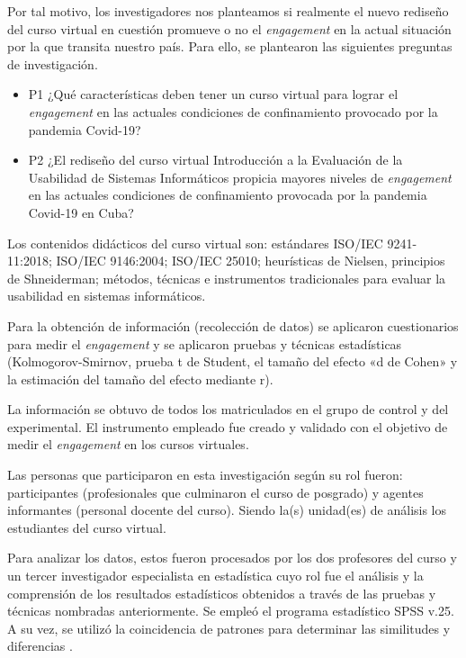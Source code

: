\documentclass{textolivre}
\begin{document}
Por tal motivo, los investigadores nos planteamos si realmente el nuevo rediseño del curso virtual en cuestión promueve o no el \emph{engagement} en la actual situación por la que transita nuestro país. Para ello, se plantearon las siguientes preguntas de investigación.

\begin{itemize}
    \item P1 ¿Qué características deben tener un curso virtual para lograr el \emph{engagement} en las actuales condiciones de confinamiento provocado por la pandemia Covid-19?
    \item P2 ¿El rediseño del curso virtual Introducción a la Evaluación de la Usabilidad de Sistemas Informáticos propicia mayores niveles de \emph{engagement} en las actuales condiciones de confinamiento provocada por la pandemia Covid-19 en Cuba?
\end{itemize}

Los contenidos didácticos del curso virtual son: estándares ISO/IEC 9241-11:2018; ISO/IEC 9146:2004; ISO/IEC 25010; heurísticas de Nielsen, principios de Shneiderman; métodos, técnicas e instrumentos tradicionales para evaluar la usabilidad en sistemas informáticos. 

Para la obtención de información (recolección de datos) se aplicaron cuestionarios para medir el \emph{engagement} y se aplicaron pruebas y técnicas estadísticas (Kolmogorov-Smirnov, prueba t de Student, el tamaño del efecto «d de Cohen» y la estimación del tamaño del efecto mediante r).

La información se obtuvo de todos los matriculados en el grupo de control y del experimental. El instrumento empleado \cite{mohd2020} %
fue creado y validado con el objetivo de medir el \emph{engagement} en los cursos virtuales.

Las personas que participaron en esta investigación según su rol fueron: participantes (profesionales que culminaron el curso de posgrado) y agentes informantes (personal docente del curso). Siendo la(s) unidad(es) de análisis los estudiantes  del curso virtual.

Para analizar los datos, estos fueron procesados por los dos profesores del curso y un tercer investigador especialista en estadística cuyo rol fue el análisis y la comprensión de los resultados estadísticos obtenidos  a través de las pruebas y técnicas nombradas anteriormente. Se empleó el programa estadístico SPSS  v.25. A su vez, se utilizó la coincidencia de patrones para determinar las similitudes y diferencias \cite{miles2014}. %
\end{document}
